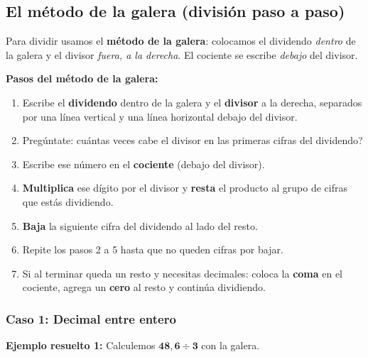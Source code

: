 \documentclass[12pt, letterpaper]{article}
\begin{document}
\subsection{El método de la galera (división paso a paso)}

Para dividir usamos el \textbf{método de la galera}: colocamos el dividendo \emph{dentro} de la galera y el divisor \emph{fuera, a la derecha}. El cociente se escribe \emph{debajo} del divisor.

\begin{cuadropasos}
  \textbf{Pasos del método de la galera:}
  \begin{enumerate}
    \item Escribe el \textbf{dividendo} dentro de la galera y el \textbf{divisor} a la derecha, separados por una línea vertical y una línea horizontal debajo del divisor.
    \item Pregúntate: \textquestiondown cuántas veces cabe el divisor en las primeras cifras del dividendo?
    \item Escribe ese número en el \textbf{cociente} (debajo del divisor).
    \item \textbf{Multiplica} ese dígito por el divisor y \textbf{resta} el producto al grupo de cifras que estás dividiendo.
    \item \textbf{Baja} la siguiente cifra del dividendo al lado del resto.
    \item Repite los pasos 2 a 5 hasta que no queden cifras por bajar.
    \item Si al terminar queda un resto y necesitas decimales: coloca la \textbf{coma} en el cociente, agrega un \textbf{cero} al resto y continúa dividiendo.
  \end{enumerate}
\end{cuadropasos}
\newpage
\subsubsection*{Caso 1: Decimal entre entero}

\noindent\textbf{Ejemplo resuelto 1:} Calculemos $\boldsymbol{48{,}6 \div 3}$ con la galera.
\end{document}
